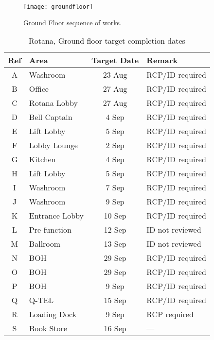 \begin{figure*}[htbp]
 \texttt{[image: groundfloor]}
  \caption{Ground Floor sequence of works.}
  \label{fig:GRsequence}
\end{figure*}
\newcommand{\rcp}{RCP/ID required }
\begin{table}[htbp]
\begin{center}
\begin{tabular}{clcl}
\toprule
Ref &Area  & Target Date & Remark\\
\midrule
A       &Washroom & 23 Aug &\rcp  \\
B       &Office & 27 Aug  &\rcp\\
C      & Rotana Lobby & 27 Aug &\rcp\\
D      & Bell Captain & 4 Sep &\rcp\\
E      &Lift Lobby & 5 Sep &\rcp\\
F      &Lobby Lounge & 2 Sep & \rcp  \\
G     & Kitchen  & 4 Sep &\rcp\\
H     &Lift Lobby& 5 Sep &\rcp\\
I    &Washroom & 7 Sep &\rcp\\
J    &Washroom & 9 Sep &\rcp\\
K     &Entrance Lobby & 10 Sep&\rcp \\
L     &Pre-function &12 Sep &ID not reviewed\\
M    &Ballroom & 13 Sep &ID not reviewed\\
N &BOH &29 Sep &\rcp \\
O &BOH &29 Sep &\rcp \\
P &BOH  &9 Sep &\rcp \\
Q &Q-TEL  &15 Sep &\rcp \\
R &Loading Dock &9 Sep &RCP required\\
S &Book Store &16 Sep & --- \\
\bottomrule
\end{tabular}
\caption{Rotana,  Ground floor  target completion dates}
\end{center}
\end{table}



